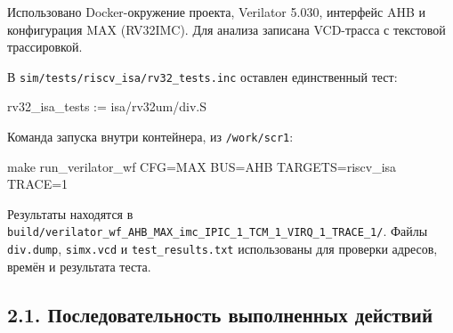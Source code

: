 \documentclass[
  russian,
]{article}
\newenvironment{Shaded}{}{}
\newcommand{\FunctionTok}[1]{\textcolor[rgb]{0.02,0.16,0.49}{#1}}
\newcommand{\NormalTok}[1]{#1}
\begin{document}
Использовано Docker-окружение проекта, Verilator 5.030, интерфейс AHB и
конфигурация MAX (RV32IMC). Для анализа записана VCD-трасса с текстовой
трассировкой.

В \texttt{sim/tests/riscv\_isa/rv32\_tests.inc} оставлен единственный
тест:

\begin{Shaded}
\begin{Highlighting}[]
\NormalTok{rv32\_isa\_tests := isa/rv32um/div.S}
\end{Highlighting}
\end{Shaded}

Команда запуска внутри контейнера, из \texttt{/work/scr1}:

\begin{Shaded}
\begin{Highlighting}[]
\FunctionTok{make}\NormalTok{ run\_verilator\_wf CFG=MAX BUS=AHB TARGETS=riscv\_isa TRACE=1}
\end{Highlighting}
\end{Shaded}

Результаты находятся в
\texttt{build/verilator\_wf\_AHB\_MAX\_imc\_IPIC\_1\_TCM\_1\_VIRQ\_1\_TRACE\_1/}.
Файлы \texttt{div.dump}, \texttt{simx.vcd} и \texttt{test\_results.txt}
использованы для проверки адресов, времён и результата теста.


\subsection*{2.1. Последовательность выполненных действий}
\end{document}
